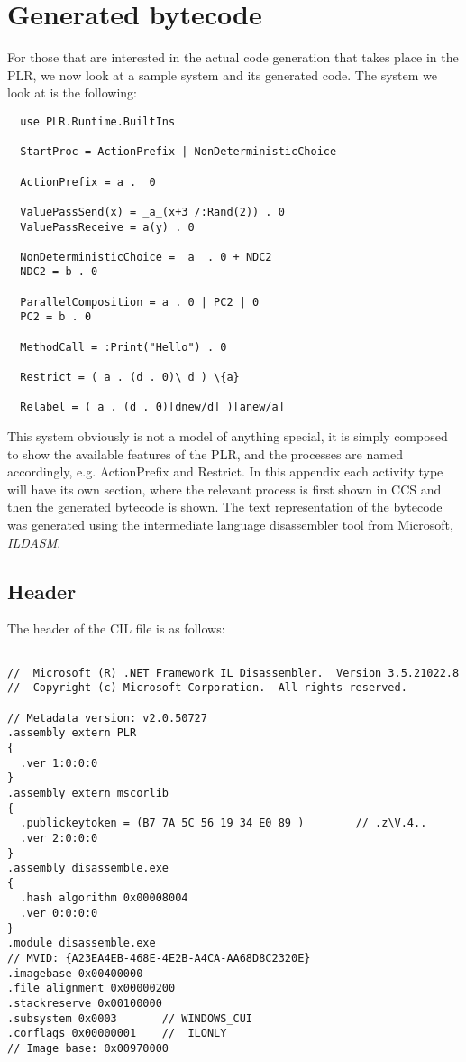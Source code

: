 \chapter{Generated bytecode}
	\lstset{basicstyle=\scriptsize\ttfamily,frame=trbl}
  For those that are interested in the actual code generation that takes place 
  in the PLR, we now look at a sample system and its generated code. The 
  system we look at is the following:
  
  \begin{verbatim}
  use PLR.Runtime.BuiltIns

  StartProc = ActionPrefix | NonDeterministicChoice 

  ActionPrefix = a .  0

  ValuePassSend(x) = _a_(x+3 /:Rand(2)) . 0
  ValuePassReceive = a(y) . 0

  NonDeterministicChoice = _a_ . 0 + NDC2
  NDC2 = b . 0
 
  ParallelComposition = a . 0 | PC2 | 0 
  PC2 = b . 0

  MethodCall = :Print("Hello") . 0

  Restrict = ( a . (d . 0)\ d ) \{a}

  Relabel = ( a . (d . 0)[dnew/d] )[anew/a]  
  \end{verbatim}

  This system obviously is not a model of anything special, it is simply 
  composed to show the available features of the PLR, and the processes are 
  named accordingly, e.g. ActionPrefix and Restrict. In this appendix each 
  activity type will have its own section, where the relevant process is first 
  shown in CCS and then the generated bytecode is shown. The text 
  representation of the bytecode was generated using the intermediate language 
  disassembler tool from Microsoft, \textit{ILDASM}.
  
  \section{Header}
  
  The header of the CIL file is as follows:

	\begin{lstlisting}

//  Microsoft (R) .NET Framework IL Disassembler.  Version 3.5.21022.8
//  Copyright (c) Microsoft Corporation.  All rights reserved.

// Metadata version: v2.0.50727
.assembly extern PLR
{
  .ver 1:0:0:0
}
.assembly extern mscorlib
{
  .publickeytoken = (B7 7A 5C 56 19 34 E0 89 )        // .z\V.4..
  .ver 2:0:0:0
}
.assembly disassemble.exe
{
  .hash algorithm 0x00008004
  .ver 0:0:0:0
}
.module disassemble.exe
// MVID: {A23EA4EB-468E-4E2B-A4CA-AA68D8C2320E}
.imagebase 0x00400000
.file alignment 0x00000200
.stackreserve 0x00100000
.subsystem 0x0003       // WINDOWS_CUI
.corflags 0x00000001    //  ILONLY
// Image base: 0x00970000

\end{lstlisting}

